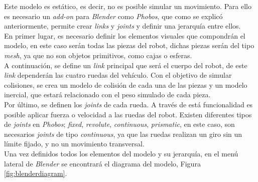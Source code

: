 Este modelo es estático, es decir, no es posible simular un movimiento. Para ello es necesario un \textit{add-on} para \textit{Blender} como \textit{Phobos}, que como se explicó
anteriormente, permite crear \textit{links} y \textit{joints} y definir una jerarquía entre ellos.\\

En primer lugar, es necesario definir los elementos visuales que compondrán el modelo, en este caso serán todas las piezas del robot, dichas piezas serán del tipo \textit{mesh},
ya que no son objetos primitivos, como cajas o esferas.\\

A continuación, se define un \textit{link} principal que será el cuerpo del robot, de este \textit{link} dependerán las cuatro ruedas del vehículo. Con el objetivo de simular
colisiones, se crea un modelo de colisión de cada una de
las piezas y un modelo inercial, que estará relacionado con el peso simulado de cada pieza.\\

Por último, se definen los \textit{joints} de cada rueda. A través de está funcionalidad es posible aplicar fuerza o velocidad a las ruedas del robot. Existen diferentes tipos de
\textit{joints} en \textit{Phobos}; \textit{fixed}, \textit{revolute}, \textit{continuous}, \textit{prismatic}, en este caso, son necesarios \textit{joints} de tipo
\textit{continuous}, ya que las ruedas realizan un giro sin un límite fijado, y no un movimiento transversal.\\

Una vez definidos todos los elementos del modelo y su jerarquía, en el menú lateral de \textit{Blender} se encontrará el diagrama del modelo, Figura \ref{fig:blenderdiagram}.\\


